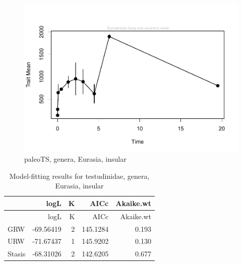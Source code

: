 \newpage

\begin{figure}[H]
	\centering
	\includegraphics{MA_JJ_files/figure-latex/pTSEsI-1.pdf}
	\caption{paleoTS, genera, Eurasia, insular}
	\label{fig:pTSEsI}
\end{figure}

\begin{longtable}[]{@{}lrrrr@{}}
	\caption{Model-fitting results for testudinidae, genera, Eurasia,
		insular}
	\label{tab:pTSEsIEM}\tabularnewline
	\toprule
	& logL & K & AICc & Akaike.wt\tabularnewline
	\midrule
	\endfirsthead
	\toprule
	& logL & K & AICc & Akaike.wt\tabularnewline
	\midrule
	\endhead
	GRW & -69.56419 & 2 & 145.1284 & 0.193\tabularnewline
	URW & -71.67437 & 1 & 145.9202 & 0.130\tabularnewline
	Stasis & -68.31026 & 2 & 142.6205 & 0.677\tabularnewline
	\bottomrule
\end{longtable}


\FloatBarrier






